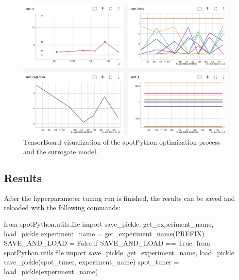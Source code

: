 \documentclass[
  letterpaper,
  DIV=11,
  numbers=noendperiod]{scrreprt}
\newenvironment{Shaded}{\begin{snugshade}}{\end{snugshade}}
\newcommand{\BuiltInTok}[1]{\textcolor[rgb]{0.00,0.23,0.31}{#1}}
\newcommand{\ControlFlowTok}[1]{\textcolor[rgb]{0.00,0.23,0.31}{#1}}
\newcommand{\ImportTok}[1]{\textcolor[rgb]{0.00,0.46,0.62}{#1}}
\newcommand{\NormalTok}[1]{\textcolor[rgb]{0.00,0.23,0.31}{#1}}
\newcommand{\OperatorTok}[1]{\textcolor[rgb]{0.37,0.37,0.37}{#1}}
\newcommand{\VariableTok}[1]{\textcolor[rgb]{0.07,0.07,0.07}{#1}}
\begin{document}
\begin{figure}[H]

{\centering \includegraphics[width=1\textwidth,height=\textheight]{figures_static/13_tensorboard_01.png}

}

\caption{TensorBoard visualization of the spotPython optimization
process and the surrogate model.}

\end{figure}%

\subsection{Results}\label{results-8}

After the hyperparameter tuning run is finished, the results can be
saved and reloaded with the following commands:

\begin{Shaded}
\begin{Highlighting}[]
\ImportTok{from}\NormalTok{ spotPython.utils.}\BuiltInTok{file} \ImportTok{import}\NormalTok{ save\_pickle, get\_experiment\_name,  load\_pickle}
\NormalTok{experiment\_name }\OperatorTok{=}\NormalTok{ get\_experiment\_name(PREFIX)}
\NormalTok{SAVE\_AND\_LOAD }\OperatorTok{=} \VariableTok{False}
\ControlFlowTok{if}\NormalTok{ SAVE\_AND\_LOAD }\OperatorTok{==} \VariableTok{True}\NormalTok{:}
    \ImportTok{from}\NormalTok{ spotPython.utils.}\BuiltInTok{file} \ImportTok{import}\NormalTok{ save\_pickle, get\_experiment\_name,  load\_pickle}
\NormalTok{    save\_pickle(spot\_tuner, experiment\_name)}
\NormalTok{    spot\_tuner }\OperatorTok{=}\NormalTok{ load\_pickle(experiment\_name)}
\end{Highlighting}
\end{Shaded}
\end{document}
